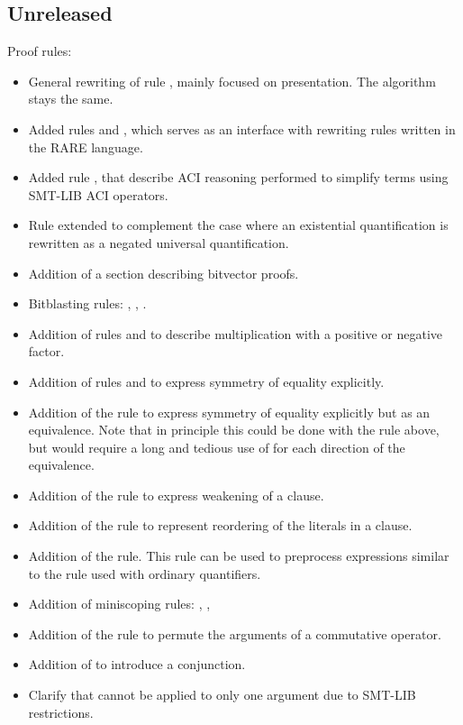 \subsection*{Unreleased}

Proof rules:
\begin{itemize}
  \item General rewriting of rule , mainly focused on presentation. The algorithm stays the same.
  \item Added rules  and , which serves as an interface with rewriting rules written in the RARE language.
  \item Added rule , that describe ACI reasoning performed 
            to simplify terms using SMT-LIB ACI operators.
  \item Rule  extended to complement the case
            where an existential quantification is rewritten as a negated universal
            quantification.
  \item Addition of a section describing bitvector proofs.
  \item Bitblasting rules: ,  ,
      .
  \item Addition of rules  and  to describe multiplication with a positive or negative factor.
  \item Addition of rules  and  to express symmetry of equality explicitly.
  \item Addition of the rule  to express symmetry
  of equality explicitly but as an equivalence. Note that in principle this
  could be done with the rule  above, but would require a long
  and tedious use of  for each direction of the equivalence.
  \item Addition of the rule  to express weakening of a
        clause.
  \item Addition of the  rule to represent reordering of
        the literals in a clause.
  \item Addition of the  rule.  This rule can be used to
        preprocess  expressions similar to the 
        rule used with ordinary quantifiers.
  \item Addition of miniscoping rules: , , 
  \item Addition of the  rule to permute the arguments of a
        commutative operator.
  \item Addition of  to introduce a conjunction.
  \item Clarify that  cannot be applied to only one
        argument due to SMT-LIB restrictions.
\end{itemize}

